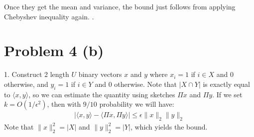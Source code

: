 \documentclass[11pt]{article}
\begin{document}
Once they get the mean and variance, the bound just follows from applying Chebyshev inequality again.
	.
	\section*{Problem 4 (b)}
	1. Construct 2 length $U$ binary vectors $x$ and $y$ where $x_i = 1$ if $i \in X$ and $0$ otherwise, and $y_i = 1$ if $i \in Y$ and $0$ otherwise. Note that $|X\cap Y|$ is exactly equal to $\langle x, y\rangle$, so we can estimate the quantity using sketches $\Pi x$ and $\Pi y$. If we set $k = O(1/\epsilon^2)$, then with $9/10$ probability we will have:
	\begin{align*}
		\left|\langle  x, y \rangle  - \langle \Pi x, \Pi y \rangle \right| \leq \epsilon \|x\|_2 \|y\|_2
	\end{align*}
Note that $\|x\|_2^2 = |X|$ and $\|y\|_2^2 = |Y|$, which yields the bound. 
\end{document}
